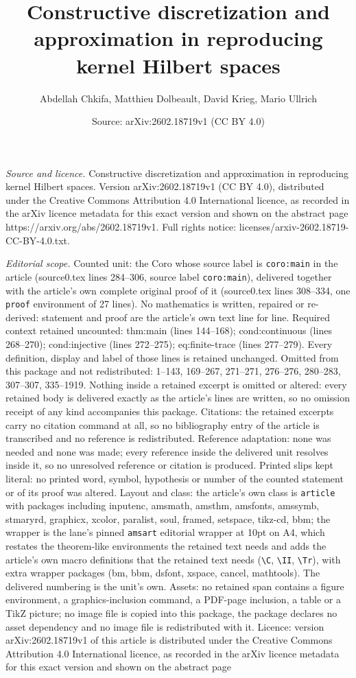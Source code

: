 \documentclass[10pt,a4paper]{amsart}
\title[Constructive discretization and approximation in reproducing]{Constructive discretization and approximation in reproducing kernel Hilbert spaces}
\author{Abdellah Chkifa, Matthieu Dolbeault, David Krieg, Mario Ullrich}
\date{Source: arXiv:2602.18719v1 (CC BY 4.0)}
\begin{document}
\maketitle

\noindent\emph{Source and licence.} Constructive discretization and approximation in reproducing kernel Hilbert spaces. Version arXiv:2602.18719v1 (CC BY 4.0), distributed under the Creative Commons Attribution 4.0 International licence, as recorded in the arXiv licence metadata for this exact version and shown on the abstract page https://arxiv.org/abs/2602.18719v1. Full rights notice: licenses/arxiv-2602.18719-CC-BY-4.0.txt.\par\smallskip

\noindent\textit{Editorial scope.} Counted unit: the Coro whose source label is \texttt{coro:main} in the article (source0.tex lines 284--306, source label \texttt{coro:main}), delivered together with the article's own complete original proof of it (source0.tex lines 308--334, one \texttt{proof} environment of 27 lines). No mathematics is written, repaired or re-derived: statement and proof are the article's own text line for line. Required context retained uncounted: thm:main (lines 144--168); cond:continuous (lines 268--270); cond:injective (lines 272--275); eq:finite-trace (lines 277--279). Every definition, display and label of those lines is retained unchanged. Omitted from this package and not redistributed: 1--143, 169--267, 271--271, 276--276, 280--283, 307--307, 335--1919. Nothing inside a retained excerpt is omitted or altered: every retained body is delivered exactly as the article's lines are written, so no omission receipt of any kind accompanies this package. Citations: the retained excerpts carry no citation command at all, so no bibliography entry of the article is transcribed and no reference is redistributed. Reference adaptation: none was needed and none was made; every reference inside the delivered unit resolves inside it, so no unresolved reference or citation is produced. Printed slips kept literal: no printed word, symbol, hypothesis or number of the counted statement or of its proof was altered. Layout and class: the article's own class is \texttt{article} with packages including inputenc, amsmath, amsthm, amsfonts, amssymb, stmaryrd, graphicx, xcolor, paralist, soul, framed, setspace, tikz-cd, bbm; the wrapper is the lane's pinned \texttt{amsart} editorial wrapper at 10pt on A4, which restates the theorem-like environments the retained text needs and adds the article's own macro definitions that the retained text needs (\texttt{\textbackslash C}, \texttt{\textbackslash II}, \texttt{\textbackslash Tr}), with extra wrapper packages (bm, bbm, dsfont, xspace, cancel, mathtools). The delivered numbering is the unit's own. Assets: no retained span contains a figure environment, a graphics-inclusion command, a PDF-page inclusion, a table or a TikZ picture; no image file is copied into this package, the package declares no asset dependency and no image file is redistributed with it. Licence: version arXiv:2602.18719v1 of this article is distributed under the Creative Commons Attribution 4.0 International licence, as recorded in the arXiv licence metadata for this exact version and shown on the abstract page 
\end{document}
